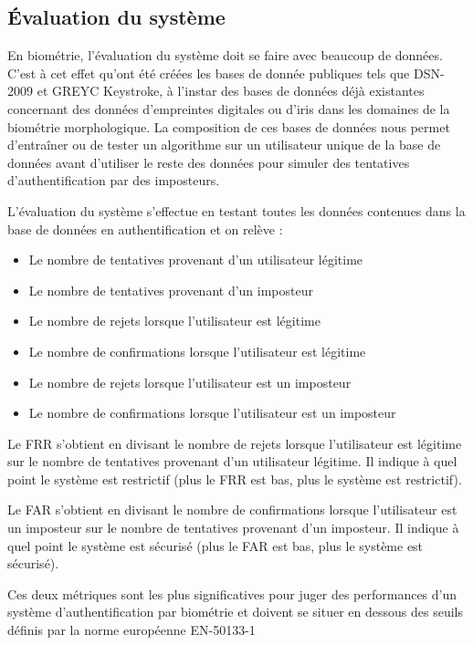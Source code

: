 \subsection{Évaluation du système}

En biométrie, l'évaluation du système doit se faire avec beaucoup de données. C'est à cet effet qu'ont été créées les bases de donnée publiques tels que DSN-2009\cite{killourhy2009} et GREYC Keystroke\cite{giotGREYC}, à l'instar des bases de données déjà existantes concernant des données d'empreintes digitales ou d'iris dans les domaines de la biométrie morphologique. La composition de ces bases de données nous permet d'entraîner ou de tester un algorithme sur un utilisateur unique de la base de données avant d'utiliser le reste des données pour simuler des tentatives d'authentification par des imposteurs.

L'évaluation du système s'effectue en testant toutes les données contenues dans la base de données en authentification et on relève :

\begin{itemize}
  \item Le nombre de tentatives provenant d'un utilisateur légitime
  \item Le nombre de tentatives provenant d'un imposteur
  \item Le nombre de rejets lorsque l'utilisateur est légitime
  \item Le nombre de confirmations lorsque l'utilisateur est légitime
  \item Le nombre de rejets lorsque l'utilisateur est un imposteur
  \item Le nombre de confirmations lorsque l'utilisateur est un imposteur
\end{itemize}

Le FRR s'obtient en divisant le nombre de rejets lorsque l'utilisateur est légitime sur le nombre de tentatives provenant d'un utilisateur légitime. Il indique à quel point le système est restrictif (plus le FRR est bas, plus le système est restrictif).

Le FAR s'obtient en divisant le nombre de confirmations lorsque l'utilisateur est un imposteur sur le nombre de tentatives provenant d'un imposteur. Il indique à quel point le système est sécurisé (plus le FAR est bas, plus le système est sécurisé).

Ces deux métriques sont les plus significatives pour juger des performances d'un système d'authentification par biométrie et doivent se situer en dessous des seuils définis par la norme européenne EN-50133-1
